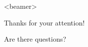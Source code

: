 \documentclass[aspectratio=3218]{beamer}
\begin{document}
\section*{}

\begin{frame}<beamer>{}
	\begin{center}
		Thanks for your attention!
	\end{center}
	\begin{center}
		Are there questions?
	\end{center}
\end{frame}
\end{document}
